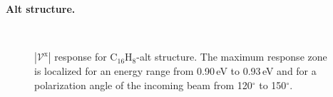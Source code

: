 \documentclass[prb,11pt,tightenlines,twocolumn,aps]{revtex4-1}
\begin{document}

\textbf{Alt structure.}
\begin{figure}[tb]
    \centering
    \\
    \caption{$|\mathcal{V}^{\mathrm{x}}|$ response for C$_{16}$H$_{8}$-alt
    structure. The maximum response zone is localized for an energy range from
    0.90\,eV to 0.93\,eV and for a polarization angle of the
    incoming beam from 120$^{\circ}$ to 150$^{\circ}$.}
    \label{fig:alt-3d}
\end{figure}
\end{document}
